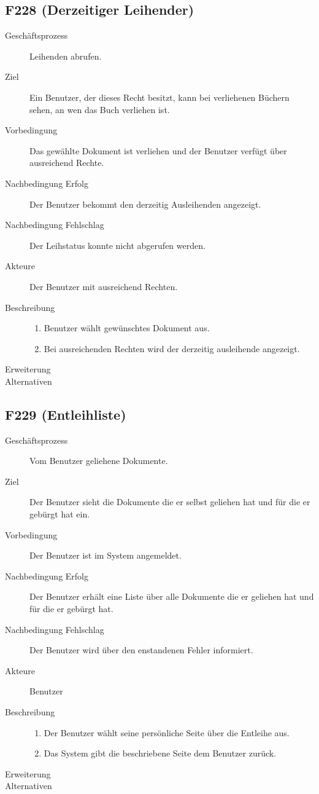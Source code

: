 \subsection{F228 (Derzeitiger Leihender)}    %
\begin{description}
  \item[Geschäftsprozess]Leihenden abrufen.
  \item[Ziel]Ein Benutzer, der dieses Recht besitzt, kann bei verliehenen Büchern sehen, an wen das Buch verliehen ist.
  \item[Vorbedingung]Das gewählte Dokument ist verliehen und der Benutzer verfügt über ausreichend Rechte.
  \item[Nachbedingung Erfolg]Der Benutzer bekommt den derzeitig Ausleihenden angezeigt.
  \item[Nachbedingung Fehlschlag]Der Leihstatus konnte nicht abgerufen werden.
  \item[Akteure]Der Benutzer mit ausreichend Rechten.
  \item[Beschreibung]\hfill
  \begin{enumerate}
  \item Benutzer wählt gewünschtes Dokument aus.
  \item Bei ausreichenden Rechten wird der derzeitig ausleihende angezeigt.
  \end{enumerate}
  \item[Erweiterung]
  \item[Alternativen]
\end{description}

\subsection{F229 (Entleihliste)}
\begin{description}
  \item[Geschäftsprozess]Vom Benutzer geliehene Dokumente.
  \item[Ziel]Der Benutzer sieht die Dokumente die er selbst geliehen hat und für die er gebürgt hat ein.
  \item[Vorbedingung]Der Benutzer ist im System angemeldet.
  \item[Nachbedingung Erfolg]Der Benutzer erhält eine Liste über alle Dokumente die er geliehen hat und für die er gebürgt hat.
  \item[Nachbedingung Fehlschlag]Der Benutzer wird über den enstandenen Fehler informiert.
  \item[Akteure]Benutzer
  \item[Beschreibung]\hfill
    \begin{enumerate}
      \item Der Benutzer wählt seine persönliche Seite über die Entleihe aus.
      \item Das System gibt die beschriebene Seite dem Benutzer zurück.
    \end{enumerate}
  \item[Erweiterung]
  \item[Alternativen]
\end{description}

